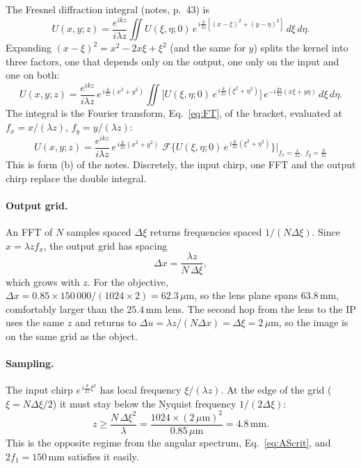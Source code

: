 \documentclass[11pt,a4paper]{article}
\newcommand{\FT}{\mathcal{F}}
\newcommand{\um}{\,\mu\mathrm{m}}
\newcommand{\mm}{\,\mathrm{mm}}
\newcommand{\ee}{e}
\newcommand{\dd}{d}
\begin{document}
The Fresnel diffraction integral (notes, p.~43) is
\begin{equation}
  U(x,y;z) = \frac{\ee^{ikz}}{i\lambda z}\iint U(\xi,\eta;0)\,
     \ee^{\,i\frac{k}{2z}\left[(x-\xi)^2+(y-\eta)^2\right]}\,\dd\xi\,\dd\eta .
  \label{eq:fresnel}
\end{equation}
Expanding $(x-\xi)^2 = x^2 - 2x\xi + \xi^2$ (and the same for $y$) splits the
kernel into three factors, one that depends only on the output, one only on
the input and one on both:
\begin{equation}
  U(x,y;z) = \frac{\ee^{ikz}}{i\lambda z}\,\ee^{\,i\frac{k}{2z}(x^2+y^2)}
  \iint\Big[U(\xi,\eta;0)\,\ee^{\,i\frac{k}{2z}(\xi^2+\eta^2)}\Big]\,
  \ee^{-i\frac{2\pi}{\lambda z}(x\xi+y\eta)}\,\dd\xi\,\dd\eta .
\end{equation}
The integral is the Fourier transform, Eq.~\eqref{eq:FT}, of the bracket,
evaluated at $f_x = x/(\lambda z)$, $f_y = y/(\lambda z)$:
\begin{equation}
  \boxed{\;U(x,y;z) = \frac{\ee^{ikz}}{i\lambda z}\,\ee^{\,i\frac{k}{2z}(x^2+y^2)}\;
  \FT\Big\{U(\xi,\eta;0)\,\ee^{\,i\frac{k}{2z}(\xi^2+\eta^2)}\Big\}
  \Big|_{f_x = \frac{x}{\lambda z},\ f_y=\frac{y}{\lambda z}}\;}
  \label{eq:fresnel1}
\end{equation}
This is form (b) of the notes. Discretely, the input chirp, one FFT and the
output chirp replace the double integral.

\paragraph{Output grid.}
An FFT of $N$ samples spaced $\Delta\xi$ returns frequencies spaced
$1/(N\Delta\xi)$. Since $x = \lambda z f_x$, the output grid has spacing
\begin{equation}
  \Delta x = \frac{\lambda z}{N\,\Delta\xi},
  \label{eq:dx2}
\end{equation}
which grows with $z$. For the objective,
$\Delta x = 0.85\times150\,000/(1024\times2) = 62.3\um$, so the lens plane
spans $63.8\mm$, comfortably larger than the $25.4\mm$ lens. The second hop
from the lens to the IP uses the same $z$ and returns to
$\Delta u = \lambda z/(N\Delta x) = \Delta\xi = 2\um$, so the image is on the
same grid as the object.

\paragraph{Sampling.}
The input chirp $\ee^{\,i\frac{k}{2z}\xi^2}$ has local frequency
$\xi/(\lambda z)$. At the edge of the grid ($\xi = N\Delta\xi/2$) it must stay
below the Nyquist frequency $1/(2\Delta\xi)$:
\begin{equation}
  z \ge \frac{N\,\Delta\xi^2}{\lambda} = \frac{1024\times(2\um)^2}{0.85\um} = 4.8\mm .
\end{equation}
This is the opposite regime from the angular spectrum,
Eq.~\eqref{eq:AScrit}, and $2f_1 = 150\mm$ satisfies it easily.
\end{document}
